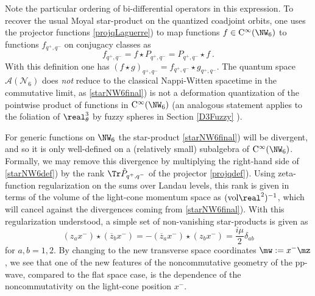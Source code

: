 Note the particular ordering of bi-differential operators in this
expression. To recover the usual Moyal star-product on the quantized
coadjoint orbits, one uses the projector functions
\eqref{projqLaguerre}) to map functions $f\in{\rm C}^\infty(\NW_6)$ to
functions $f_{q^+,q^-}$ on conjugacy classes as
\begin{equation}
f_{q^+,q^-}=f\star P_{q^+,q^-}=P_{q^+,q^-}\star f \ .
\label{fconjclassprojq}\end{equation}
With this definition one has $(f\star g)_{q^+,q^-}=f_{q^+,q^-}\star
g_{q^+,q^-}$. The quantum space $\mathcal{A}(\mathcal{N}_6)$ does {\it
  not} reduce to the classical Nappi-Witten spacetime in the
commutative limit, as \eqref{starNW6final}) is not a deformation
quantization of the pointwise product of functions in ${\rm
  C}^\infty(\NW_6)$ (an analogous statement applies to the foliation of
$\real_\theta^3$ by fuzzy spheres in
Section \ref{D3Fuzzy} \cite{HLS-J1}).

For generic functions on $\NW_6$ the star-product
\eqref{starNW6final}) will be divergent, and so it is only well-defined
on a (relatively small) subalgebra of ${\rm
  C}^\infty(\NW_6)$. Formally, we may remove this divergence by
multiplying the right-hand side of \eqref{starNW6def}) by the rank
$\Tr \hat P_{q^+,q^-}$ of the projector \eqref{projqdef}). Using
zeta-function regularization on the sums over Landau levels, this rank
is given in terms of the volume of the light-cone momentum space as
$({\rm vol} \real^2)^{-1}$, which will cancel against the divergences
coming from \eqref{starNW6final}). With this regularization understood,
a simple set of non-vanishing star-products is given as
\begin{equation}
\left(z_a x^-\right)\star\left( \overline{z}_b x^-\right)=
-\left( \overline{z}_a x^-\right)\star\left(z_b x^-\right)=
\mbox{$\frac{ i\mu}2$} \delta_{ab}
\label{simplestarprods}\end{equation}
for $a,b=1,2$. By changing to the new transverse space coordinates
$\mw:=x^- \mz$, we see that one of the new features of the
noncommutative geometry of the pp-wave, compared to the flat space
case, is the dependence of the noncommutativity on the light-cone
position $x^-$.

